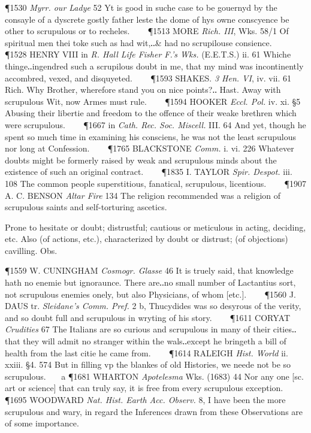 \begin{description}[wide, labelwidth=!, labelindent=0pt]
\begin{myenumerate}
\P 1530  \textit{Myrr. our Ladye} 52 Yt is good in suche case to be gouernyd by the consayle of a dyscrete gostly father leste the dome of hys owne conscyence be other to scrupulous or to recheles.    
\P 1513 MORE  \textit{Rich. III}, Wks. 58/1 Of spiritual men thei toke such as had wit,‥\& had no scrupilouse consience.    
\P 1528 HENRY VIII in  \textit{R. Hall Life Fisher F.'s Wks.} (E.E.T.S.) ii. 61 Whiche thinge‥ingendred such a scrupilous doubt in me, that my mind was incontinently accombred, vexed, and disquyeted.    
\P 1593 SHAKES.  \textit{3 Hen. VI}, iv. vii. 61 Rich. Why Brother, wherefore stand you on nice points?‥ Hast. Away with scrupulous Wit, now Armes must rule.    
\P 1594 HOOKER  \textit{Eccl. Pol.} iv. xi. §5 Abusing their libertie and freedom to the offence of their weake brethren which were scrupulous.    
\P 1667 in  \textit{Cath. Rec. Soc. Miscell.} III. 64 And yet, though he spent so much time in examining his consciens, he was not the least scrupulous nor long at Confession.    
\P 1765 BLACKSTONE  \textit{Comm.} i. vi. 226 Whatever doubts might be formerly raised by weak and scrupulous minds about the existence of such an original contract.    
\P 1835 I. TAYLOR  \textit{Spir. Despot.} iii. 108 The common people superstitious, fanatical, scrupulous, licentious.    
\P 1907 A. C. BENSON  \textit{Altar Fire} 134 The religion recommended was a religion of scrupulous saints and self-torturing ascetics.

 Prone to hesitate or doubt; distrustful; cautious or meticulous in acting, deciding, etc. Also (of actions, etc.), characterized by doubt or distrust; (of objections) cavilling. Obs.

\P 1559 W. CUNINGHAM  \textit{Cosmogr. Glasse} 46 It is truely said, that knowledge hath no enemie but ignoraunce. There are‥no small number of Lactantius sort, not scrupulous enemies onely, but also Physicians, of whom [etc.].    
\P 1560 J. DAUS tr. \textit{Sleidane's Comm. Pref.} 2 b, Thucydides was so desyrous of the verity, and so doubt full and scrupulous in wryting of his story.    
\P 1611 CORYAT  \textit{Crudities} 67 The Italians are so curious and scrupulous in many of their cities‥that they will admit no stranger within the wals‥except he bringeth a bill of health from the last citie he came from.    
\P 1614 RALEIGH  \textit{Hist. World} ii. xxiii. §4. 574 But in filling vp the blankes of old Histories, we neede not be so scrupulous.    a 
\P 1681 WHARTON  \textit{Apotelesma} Wks. (1683) 44 Nor any one [sc. art or science] that can truly say, it is free from every scrupulous exception.    
\P 1695 WOODWARD  \textit{Nat. Hist. Earth Acc. Observ.} 8, I have been the more scrupulous and wary, in regard the Inferences drawn from these Observations are of some importance.


\end{myenumerate}
\end{description}
